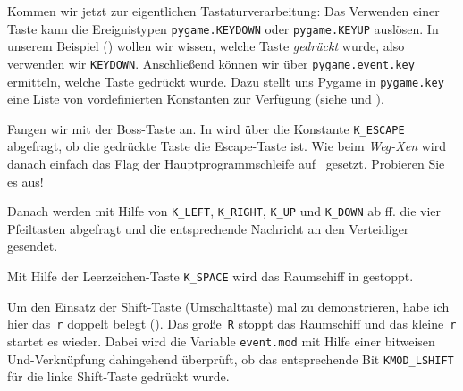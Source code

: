 
Kommen wir jetzt zur eigentlichen Tastaturverarbeitung: Das Verwenden einer Taste kann die Ereignistypen \texttt{pygame.KEYDOWN} oder \texttt{pygame.KEYUP} auslösen. In unserem Beispiel () wollen wir wissen, welche Taste \emph{gedrückt} wurde, also verwenden wir \texttt{KEYDOWN}. Anschließend können wir über \texttt{pygame.event.key} ermitteln, welche Taste gedrückt wurde. Dazu stellt uns Pygame in \texttt{pygame.key} eine Liste von vordefinierten Konstanten zur Verfügung (siehe  und ).


Fangen wir mit der Boss-Taste an. In  wird über die Konstante \texttt{K\_ESCAPE} abgefragt, ob die gedrückte Taste die Escape-Taste ist. Wie beim \emph{Weg-Xen} wird danach einfach das Flag der Hauptprogrammschleife auf \false\ gesetzt. Probieren Sie es aus!

Danach werden mit Hilfe von \texttt{K\_LEFT}, \texttt{K\_RIGHT}, \texttt{K\_UP} und \texttt{K\_DOWN} ab ff. die vier Pfeiltasten abgefragt und die entsprechende Nachricht an den Verteidiger gesendet.

Mit Hilfe der Leerzeichen-Taste \texttt{K\_SPACE} wird das Raumschiff in  gestoppt. 

Um den Einsatz der Shift-Taste (Umschalttaste) mal zu demonstrieren, habe ich hier das~\texttt{r} doppelt belegt (). Das große~\texttt{R} stoppt das Raumschiff und das kleine~\texttt{r} startet es wieder. Dabei wird die Variable \texttt{event.mod} mit Hilfe einer bitweisen Und-Verknüpfung dahingehend überprüft, ob das entsprechende Bit \texttt{KMOD\_LSHIFT} für die linke Shift-Taste gedrückt wurde.

